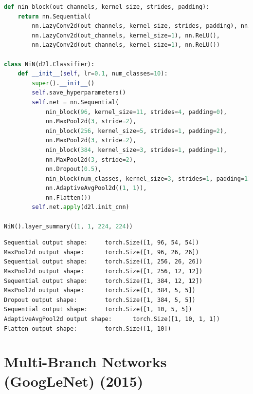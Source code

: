 \begin{lstlisting}[language=Python]
def nin_block(out_channels, kernel_size, strides, padding):
    return nn.Sequential(
        nn.LazyConv2d(out_channels, kernel_size, strides, padding), nn.ReLU(),
        nn.LazyConv2d(out_channels, kernel_size=1), nn.ReLU(),
        nn.LazyConv2d(out_channels, kernel_size=1), nn.ReLU())

class NiN(d2l.Classifier):
    def __init__(self, lr=0.1, num_classes=10):
        super().__init__()
        self.save_hyperparameters()
        self.net = nn.Sequential(
            nin_block(96, kernel_size=11, strides=4, padding=0),
            nn.MaxPool2d(3, stride=2),
            nin_block(256, kernel_size=5, strides=1, padding=2),
            nn.MaxPool2d(3, stride=2),
            nin_block(384, kernel_size=3, strides=1, padding=1),
            nn.MaxPool2d(3, stride=2),
            nn.Dropout(0.5),
            nin_block(num_classes, kernel_size=3, strides=1, padding=1),
            nn.AdaptiveAvgPool2d((1, 1)),
            nn.Flatten())
        self.net.apply(d2l.init_cnn)

NiN().layer_summary((1, 1, 224, 224))
\end{lstlisting}

\begin{lstlisting}[numbers=none]
Sequential output shape:     torch.Size([1, 96, 54, 54])
MaxPool2d output shape:      torch.Size([1, 96, 26, 26])
Sequential output shape:     torch.Size([1, 256, 26, 26])
MaxPool2d output shape:      torch.Size([1, 256, 12, 12])
Sequential output shape:     torch.Size([1, 384, 12, 12])
MaxPool2d output shape:      torch.Size([1, 384, 5, 5])
Dropout output shape:        torch.Size([1, 384, 5, 5])
Sequential output shape:     torch.Size([1, 10, 5, 5])
AdaptiveAvgPool2d output shape:      torch.Size([1, 10, 1, 1])
Flatten output shape:        torch.Size([1, 10])
\end{lstlisting}








\section{Multi-Branch Networks (GoogLeNet) (2015) \cite{arxiv/1409.4842-googlenet,dnn-1}} \label{Multi-Branch Networks (GoogLeNet)}

